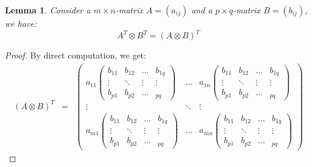 \documentclass[a4paper,11pt]{report}
\newtheorem{lemma}[theorem]{Lemma}
\begin{document}
\begin{lemma}\label{hulptensor}
  Consider a $m \times 
  n$-matrix $A = (a_{ij})$ and a $p \times q$-matrix $B=(b_{ij})$, we have:
  $$A^T \otimes B^T = (A\otimes B)^T$$
\end{lemma}
\begin{proof}
  By direct computation, we get:
  \begin{eqnarray*}
    (A \otimes B)^T  &=& \begin{pmatrix}
  a_{11}\begin{pmatrix}
  b_{11} & b_{12} & \ldots & b_{1q}\\
  \vdots & \ddots & \vdots &\vdots\\
  b_{p1} & b_{p2} & \ldots & _{pq}
  \end{pmatrix}
  
 & \ldots & a_{1n}\begin{pmatrix}
  b_{11} & b_{12} & \ldots & b_{1q}\\
  \vdots & \ddots & \vdots &\vdots\\
  b_{p1} & b_{p2} & \ldots & _{pq}
  \end{pmatrix}
\\
  \vdots & \ddots & \vdots \\
  a_{m1}\begin{pmatrix}
  b_{11} & b_{12} & \ldots & b_{1q}\\
  \vdots & \ddots & \vdots &\vdots\\
  b_{p1} & b_{p2} & \ldots & _{pq}
  \end{pmatrix}
 & \ldots & a_{mn}\begin{pmatrix}
  b_{11} & b_{12} & \ldots & b_{1q}\\
  \vdots & \ddots & \vdots &\vdots\\
  b_{p1} & b_{p2} & \ldots & _{pq}
  \end{pmatrix}


\end{pmatrix}
\end{eqnarray*}
\end{proof}
\end{document}
